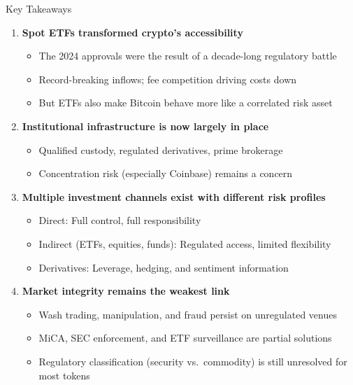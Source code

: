 \documentclass[10pt]{beamer}
\begin{document}
\begin{frame}{Key Takeaways}
  \begin{enumerate}
    \item \textbf{Spot ETFs transformed crypto's accessibility}
    \begin{itemize}
      \item The 2024 approvals were the result of a decade-long regulatory battle
      \item Record-breaking inflows; fee competition driving costs down
      \item But ETFs also make Bitcoin behave more like a correlated risk asset
    \end{itemize}
    
    \vspace{0.3em}
    \item \textbf{Institutional infrastructure is now largely in place}
    \begin{itemize}
      \item Qualified custody, regulated derivatives, prime brokerage
      \item Concentration risk (especially Coinbase) remains a concern
    \end{itemize}
    
    \vspace{0.3em}
    \item \textbf{Multiple investment channels exist with different risk profiles}
    \begin{itemize}
      \item Direct: Full control, full responsibility
      \item Indirect (ETFs, equities, funds): Regulated access, limited flexibility
      \item Derivatives: Leverage, hedging, and sentiment information
    \end{itemize}
    
    \vspace{0.3em}
    \item \textbf{Market integrity remains the weakest link}
    \begin{itemize}
      \item Wash trading, manipulation, and fraud persist on unregulated venues
      \item MiCA, SEC enforcement, and ETF surveillance are partial solutions
      \item Regulatory classification (security vs.\ commodity) is still unresolved for most tokens
    \end{itemize}
  \end{enumerate}
\end{frame}
\end{document}
